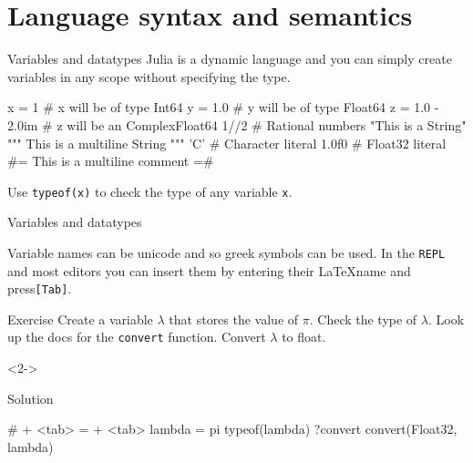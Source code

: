 \documentclass{beamer}
\newenvironment{Boxx}{\begin{tcolorbox}[standard jigsaw, opacityframe=0.8, opacityback=0.0]}{\end{tcolorbox}}
\begin{document}
\section{Language syntax and semantics}
\begin{frame}[fragile]{Variables and datatypes}
  Julia is a dynamic language and you can simply create variables in any scope without specifying the type.
  \begin{Boxx}
  \begin{jllisting}
  x = 1   # x will be of type Int64
  y = 1.0 # y will be of type Float64
  z = 1.0 - 2.0im # z will be an Complex{Float64}
  1//2 # Rational numbers
  "This is a String"
  """
  This is a multiline
  String
  """
  'C' # Character literal
  1.0f0 # Float32 literal
  #=
  This is a multiline comment
  =#
  \end{jllisting}
\end{Boxx}
  Use \verb|typeof(x)| to check the type of any variable \verb|x|.
\end{frame}

\begin{frame}[fragile]{Variables and datatypes}
	\begin{overlayarea}{\linewidth}{7cm}
	
	Variable names can be unicode and so greek symbols can be used. In the \verb|REPL| and most editors you can insert them by entering their \LaTeX name and press\verb|[Tab]|.
	
	\begin{block}{Exercise}
		Create a variable $\lambda$ that stores the value of $\pi$.
		Check the type of $\lambda$.
		Look up the docs for the \verb|convert| function.
		Convert $\lambda$ to float.
	\end{block}
	\vfill
	\begin{onlyenv}<2->
	\begin{block}{Solution}
		\vspace*{1mm}
		\begin{jllisting}
  # \lambda + <tab> = \pi + <tab>
  lambda = pi
  typeof(lambda)
  ?convert
  convert(Float32, lambda)
		\end{jllisting}
	\vspace*{1mm}
	\end{block}
\end{onlyenv}
\end{overlayarea}
\end{frame}
\end{document}
